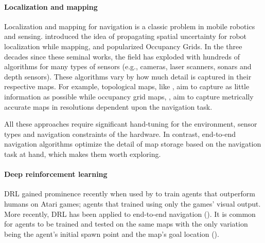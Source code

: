 \paragraph{Localization and mapping}
Localization and mapping for navigation is a classic problem in mobile robotics and sensing.
\cite{SmChIJRR1986} introduced the idea of propagating spatial uncertainty for robot localization while mapping, and \cite{ElCOMPUTER1980} popularized Occupancy Grids.
In the three decades since these seminal works, the field has exploded with hundreds of algorithms for many types of sensors (e.g., cameras, laser scanners, sonars and depth sensors).
These algorithms vary by how much detail is captured in their respective maps. For example, topological maps, like \cite{KuCOGSCI1978}, aim to capture as little information as possible while occupancy grid maps, \cite{ElCOMPUTER1980}, aim to capture metrically accurate maps in resolutions dependent upon the navigation task.

All these approaches require significant hand-tuning for the environment, sensor types and navigation constraints of the hardware.
In contrast, end-to-end navigation algorithms optimize the detail of map storage based on the navigation task at hand, which makes them worth exploring.

\paragraph{Deep reinforcement learning}
DRL gained prominence recently when used by \cite{MnKaSiNIPSDLW2013,MnKaSiNATURE2015} to train agents that outperform humans on Atari games; agents that trained using only the games' visual output.
More recently, DRL has been applied to end-to-end navigation (\cite{OhChSiICML2016,MiPaViICLR2017,ChLaSaNIPS2016}).
It is common for agents to be trained and tested on the same maps with the only variation being the agent's initial spawn point and the map's goal location (\cite{MiPaViICLR2017,ZhMoKoICRA2017,KuSaGaAPA2016}). 


